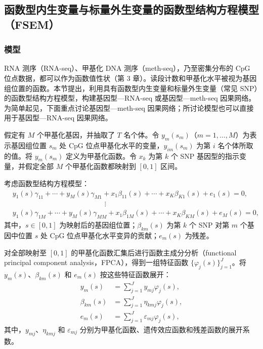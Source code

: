 \subsection{函数型内生变量与标量外生变量的函数型结构方程模型（FSEM）}
\subsubsection{模型}

RNA 测序（RNA-seq）、甲基化 DNA 测序（meth-seq），乃至密集分布的 CpG 位点数据，都可以作为函数值性状（第 3 章）。读段计数和甲基化水平被视为基因组位置的函数。本节提出，利用具有函数型内生变量和标量外生变量（常见 SNP）的函数型结构方程模型，构建基因型—RNA-seq 或基因型—meth-seq 因果网络。为简单起见，下面重点讨论基因型—meth-seq 因果网络；所讨论模型也可以直接用于基因型—RNA-seq 因果网络。

假定有 $M$ 个甲基化基因，并抽取了 $T$ 名个体。令 $y_m(s_m)$（$m=1,\ldots,M$）为表示基因组位置 $s_m$ 处 CpG 位点甲基化水平的变量，$y_{im}(s_m)$ 为第 $i$ 名个体所取的值。将 $y_m(s_m)$ 定义为甲基化函数。令 $x_k$ 为第 $k$ 个 SNP 基因型的指示变量，并假定全部 $M$ 个甲基化函数都映射到 $[0,1]$ 区间。

考虑函数型结构方程模型：
\begin{equation}
\begin{aligned}
&y_1(s)\gamma_{11}+\cdots+y_M(s)\gamma_{M1}
+x_1\beta_{11}(s)+\cdots+x_K\beta_{K1}(s)+e_1(s)=0,\\
&\hspace{13em}\vdots\\
&y_1(s)\gamma_{1M}+\cdots+y_M(s)\gamma_{MM}
+x_1\beta_{1M}(s)+\cdots+x_K\beta_{KM}(s)+e_M(s)=0,
\end{aligned}
\tag{5.84}
\end{equation}
其中，$s\in[0,1]$ 为映射后的基因组位置；$\beta_{km}(s)$ 为第 $k$ 个 SNP 对第 $m$ 个基因中位置 $s$ 处 CpG 位点甲基化水平变异的贡献；$e_m(s)$ 为残差。

对全部映射至 $[0,1]$ 的甲基化函数汇集后进行函数主成分分析（functional principal component analysis，FPCA），得到一组特征函数 $\{\varphi_j(s)\}_{j=1}^J$。将 $y_m(s)$、$\beta_{km}(s)$ 和 $e_m(s)$ 按这些特征函数展开：
\begin{equation}
\begin{aligned}
y_m(s)&=\sum_{j=1}^Jy_{mj}\varphi_j(s),\\
\beta_{km}(s)&=\sum_{j=1}^J\eta_{kmj}\varphi_j(s),\\
e_m(s)&=\sum_{j=1}^J\varepsilon_{mj}\varphi_j(s),
\end{aligned}
\tag{5.85}
\end{equation}
其中，$y_{mj}$、$\eta_{kmj}$ 和 $\varepsilon_{mj}$ 分别为甲基化函数、遗传效应函数和残差函数的展开系数。

